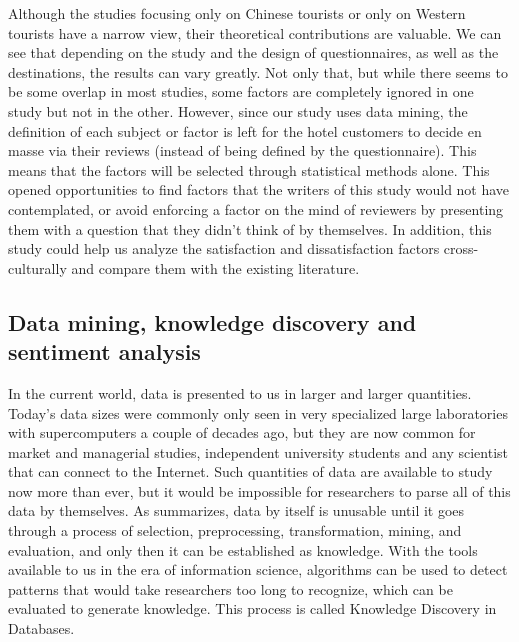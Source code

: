 Although the studies focusing only on Chinese tourists or only on Western tourists have a narrow view, their theoretical contributions are valuable. We can see that depending on the study and the design of questionnaires, as well as the destinations, the results can vary greatly. Not only that, but while there seems to be some overlap in most studies, some factors are completely ignored in one study but not in the other. However, since our study uses data mining, the definition of each subject or factor is left for the hotel customers to decide en masse via their reviews (instead of being defined by the questionnaire). This means that the factors will be selected through statistical methods alone. This opened opportunities to find factors that the writers of this study would not have contemplated, or avoid enforcing a factor on the mind of reviewers by presenting them with a question that they didn't think of by themselves. In addition, this study could help us analyze the satisfaction and dissatisfaction factors cross-culturally and compare them with the existing literature.

\subsection{Data mining, knowledge discovery and sentiment analysis}\label{theory_data}

In the current world, data is presented to us in larger and larger quantities. Today's data sizes were commonly only seen in very specialized large laboratories with supercomputers a couple of decades ago, but they are now common for market and managerial studies, independent university students and any scientist that can connect to the Internet. Such quantities of data are available to study now more than ever, but it would be impossible for researchers to parse all of this data by themselves. As \cite{fayyad1996data} summarizes, data by itself is unusable until it goes through a process of selection, preprocessing, transformation, mining, and evaluation, and only then it can be established as knowledge. With the tools available to us in the era of information science, algorithms can be used to detect patterns that would take researchers too long to recognize, which can be evaluated to generate knowledge. This process is called Knowledge Discovery in Databases. 

